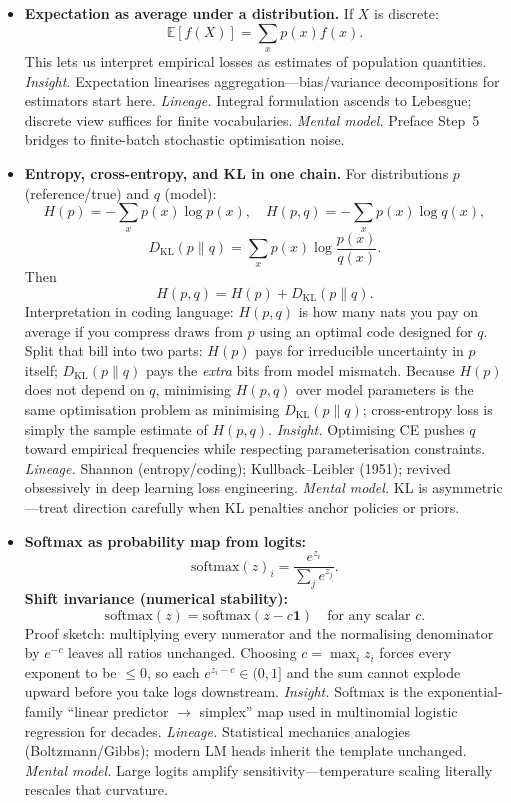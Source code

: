 \begin{itemize}[leftmargin=1.5em]
  \item \textbf{Expectation as average under a distribution.} If $X$ is discrete:
  \[
    \mathbb{E}[f(X)] = \sum_x p(x)f(x).
  \]
  This lets us interpret empirical losses as estimates of population quantities.
  \textit{Insight.} Expectation linearises aggregation---bias/variance decompositions for estimators start here.
  \textit{Lineage.} Integral formulation ascends to Lebesgue; discrete view suffices for finite vocabularies.
  \textit{Mental model.} Preface Step~5 bridges to finite-batch stochastic optimisation noise.

  \item \textbf{Entropy, cross-entropy, and KL in one chain.}
  For distributions $p$ (reference/true) and $q$ (model):
  \[
    H(p) = -\sum_x p(x)\log p(x),\quad
    H(p,q) = -\sum_x p(x)\log q(x),
  \]
  \[
    D_{\mathrm{KL}}(p\|q)=\sum_x p(x)\log\frac{p(x)}{q(x)}.
  \]
  Then
  \[
    H(p,q) = H(p) + D_{\mathrm{KL}}(p\|q).
  \]
  Interpretation in coding language: $H(p,q)$ is how many nats you pay on average if you compress draws from $p$ using an optimal code designed for $q$. Split that bill into two parts: $H(p)$ pays for irreducible uncertainty in $p$ itself; $D_{\mathrm{KL}}(p\|q)$ pays the \emph{extra} bits from model mismatch. Because $H(p)$ does not depend on $q$, minimising $H(p,q)$ over model parameters is the same optimisation problem as minimising $D_{\mathrm{KL}}(p\|q)$; cross-entropy loss is simply the sample estimate of $H(p,q)$.
  \textit{Insight.} Optimising CE pushes $q$ toward empirical frequencies while respecting parameterisation constraints.
  \textit{Lineage.} Shannon (entropy/coding); Kullback--Leibler (1951); revived obsessively in deep learning loss engineering.
  \textit{Mental model.} KL is asymmetric---treat direction carefully when KL penalties anchor policies or priors.

  \item \textbf{Softmax as probability map from logits:}
  \[
    \mathrm{softmax}(z)_i = \frac{e^{z_i}}{\sum_j e^{z_j}}.
  \]
  \textbf{Shift invariance (numerical stability):}
  \[
    \mathrm{softmax}(z) = \mathrm{softmax}(z - c\mathbf{1}) \quad \text{for any scalar } c.
  \]
\nobreak
  Proof sketch: multiplying every numerator and the normalising denominator by $e^{-c}$ leaves all ratios unchanged. Choosing $c=\max_i z_i$ forces every exponent to be $\le 0$, so each $e^{z_i-c}\in(0,1]$ and the sum cannot explode upward before you take logs downstream.
  \textit{Insight.} Softmax is the exponential-family ``linear predictor $\to$ simplex'' map used in multinomial logistic regression for decades.
  \textit{Lineage.} Statistical mechanics analogies (Boltzmann/Gibbs); modern LM heads inherit the template unchanged.
  \textit{Mental model.} Large logits amplify sensitivity---temperature scaling literally rescales that curvature.


\end{itemize}
